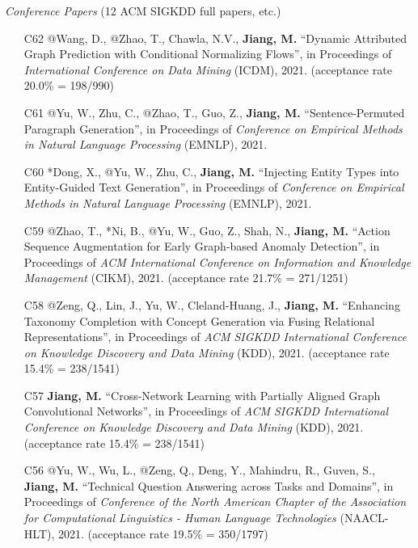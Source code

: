 \documentclass[10pt]{article}
\newenvironment{myindentpar}[1]%
{\begin{list}{}%
         {\setlength{\leftmargin}{#1}}%
         \item[]%
}
{\end{list}}
\newcounter{list}
\begin{document}
\begin{myindentpar}{0.00cm}

\hspace{-0.25cm}\textit{Conference Papers} {\small (12 ACM SIGKDD full papers, etc.)}

\begin{enumerate}[leftmargin=.5cm]

\item[C62] @Wang, D., @Zhao, T., Chawla, N.V., \textbf{Jiang, M.} ``Dynamic Attributed Graph Prediction with Conditional Normalizing Flows'', in Proceedings of \textit{International Conference on Data Mining} (ICDM), 2021. (acceptance rate 20.0\% = 198/990)

\item[C61] @Yu, W., Zhu, C., @Zhao, T., Guo, Z., \textbf{Jiang, M.} ``Sentence-Permuted Paragraph Generation'', in Proceedings of \textit{Conference on Empirical Methods in Natural Language Processing} (EMNLP), 2021.

\item[C60] *Dong, X., @Yu, W., Zhu, C., \textbf{Jiang, M.} ``Injecting Entity Types into Entity-Guided Text Generation'', in Proceedings of \textit{Conference on Empirical Methods in Natural Language Processing} (EMNLP), 2021.

\item[C59] @Zhao, T., *Ni, B., @Yu, W., Guo, Z., Shah, N., \textbf{Jiang, M.} ``Action Sequence Augmentation for Early Graph-based Anomaly Detection'', in Proceedings of \textit{ACM International Conference on Information and Knowledge Management} (CIKM), 2021. (acceptance rate 21.7\% = 271/1251)
		
\item[C58] @Zeng, Q., Lin, J., Yu, W., Cleland-Huang, J., \textbf{Jiang, M.} ``Enhancing Taxonomy Completion with Concept Generation via Fusing Relational Representations'', in Proceedings of \textit{ACM SIGKDD International Conference on Knowledge Discovery and Data Mining} (KDD), 2021. (acceptance rate 15.4\% = 238/1541)

\item[C57] \textbf{Jiang, M.} ``Cross-Network Learning with Partially Aligned Graph Convolutional Networks'', in Proceedings of \textit{ACM SIGKDD International Conference on Knowledge Discovery and Data Mining} (KDD), 2021. (acceptance rate 15.4\% = 238/1541)	

\item[C56] @Yu, W., Wu, L., @Zeng, Q., Deng, Y., Mahindru, R., Guven, S., \textbf{Jiang, M.} ``Technical Question Answering across Tasks and Domains'', in Proceedings of \textit{Conference of the North American Chapter of the Association for Computational Linguistics - Human Language Technologies} (NAACL-HLT), 2021. (acceptance rate 19.5\% = 350/1797)


\end{enumerate}
\end{myindentpar}
\end{document}
